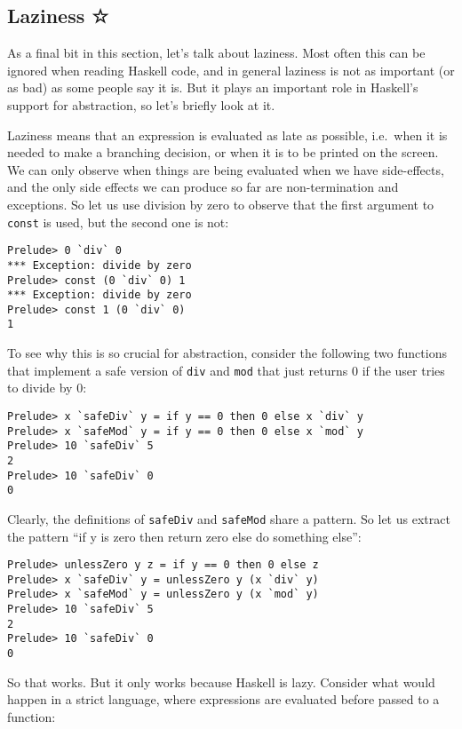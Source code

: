\documentclass[11pt,
  american,
  DIV13]{article}
\begin{document}
\hypertarget{laziness}{%
\subsection{Laziness ☆}\label{laziness}}

As a final bit in this section, let's talk about laziness. Most often
this can be ignored when reading Haskell code, and in general laziness
is not as important (or as bad) as some people say it is. But it plays
an important role in Haskell's support for abstraction, so let's briefly
look at it.

Laziness means that an expression is evaluated as late as possible,
i.e.~when it is needed to make a branching decision, or when it is to be
printed on the screen. We can only observe when things are being
evaluated when we have side-effects, and the only side effects we can
produce so far are non-termination and exceptions. So let us use
division by zero to observe that the first argument to \texttt{const} is
used, but the second one is not:

\begin{verbatim}
Prelude> 0 `div` 0
*** Exception: divide by zero
Prelude> const (0 `div` 0) 1
*** Exception: divide by zero
Prelude> const 1 (0 `div` 0)
1
\end{verbatim}

To see why this is so crucial for abstraction, consider the following
two functions that implement a safe version of \texttt{div} and
\texttt{mod} that just returns 0 if the user tries to divide by 0:

\begin{verbatim}
Prelude> x `safeDiv` y = if y == 0 then 0 else x `div` y
Prelude> x `safeMod` y = if y == 0 then 0 else x `mod` y
Prelude> 10 `safeDiv` 5
2
Prelude> 10 `safeDiv` 0
0
\end{verbatim}

Clearly, the definitions of \texttt{safeDiv} and \texttt{safeMod} share
a pattern. So let us extract the pattern ``if y is zero then return zero
else do something else'':

\begin{verbatim}
Prelude> unlessZero y z = if y == 0 then 0 else z
Prelude> x `safeDiv` y = unlessZero y (x `div` y)
Prelude> x `safeMod` y = unlessZero y (x `mod` y)
Prelude> 10 `safeDiv` 5
2
Prelude> 10 `safeDiv` 0
0
\end{verbatim}

So that works. But it only works because Haskell is lazy. Consider what
would happen in a strict language, where expressions are evaluated
before passed to a function:
\end{document}
